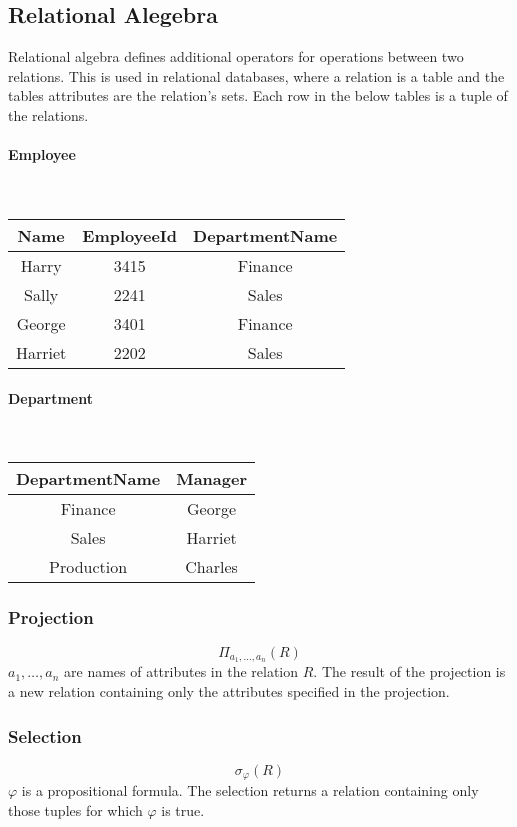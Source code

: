 \documentclass[a4paper, 10pt]{article}
\begin{document}
\subsection{Relational Alegebra}
Relational algebra defines additional operators for operations between two relations. This is used in relational databases, where a relation is a table and the tables attributes are the relation's sets. Each row in the below tables is a tuple of the relations.
\begin{multicols}{2}
\paragraph{Employee}\mbox{}\\
    \begin{tabular}{| c | c | c |}
        \hline
        Name  & EmployeeId & DepartmentName \\
        \hline
        Harry   & 3415     & Finance      \\
        Sally   & 2241     & Sales        \\
        George  & 3401     & Finance      \\
        Harriet & 2202     & Sales        \\
        \hline
    \end{tabular}

    \paragraph{Department}\mbox{}\\
    \begin{tabular}{| c | c |}
        \hline
        DepartmentName & Manager \\
        \hline
        Finance    & George      \\
        Sales      & Harriet     \\
        Production & Charles     \\
        \hline
    \end{tabular}
\end{multicols}
\subsubsection{Projection}
\[ \Pi_{a_1,\ldots, a_n}(R) \]
\(a_1,\ldots,a_n\) are names of attributes in the relation \(R\). The result of the projection is a new relation containing only the attributes specified in the projection.
\subsubsection{Selection}
\[ \sigma_\varphi(R) \]
\(\varphi\) is a propositional formula. The selection returns a relation containing only those tuples for which \(\varphi\) is true.
\end{document}
